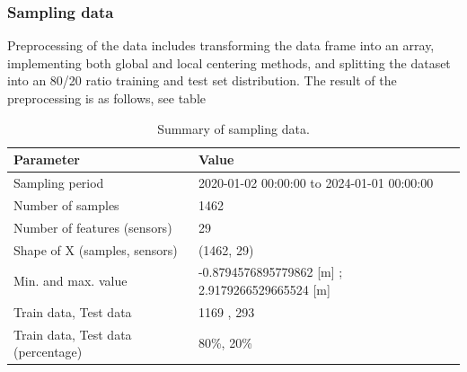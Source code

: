 \subsubsection{Sampling data}
Preprocessing of the data includes transforming the data frame into an array, implementing both global and local centering methods, and splitting the dataset into an 80/20 ratio training and test set distribution. The result of the preprocessing is as follows, see table 
\begin{table}[htbp]
\centering
\caption{Summary of sampling data.}
\label{data}
\begin{tabular}{|l|l|}
\hline
\textbf{Parameter}                           & \textbf{Value}                                \\ \hline
Sampling period                              & 2020-01-02 00:00:00 to 2024-01-01 00:00:00\\ \hline
Number of samples                            & 1462\\ \hline
Number of features (sensors)                 & 29                                            \\ \hline
Shape of X (samples, sensors)                & (1462, 29)\\ \hline
Min. and max. value                          & -0.8794576895779862 [m] ; 2.9179266529665524 [m]\\ \hline
Train data, Test data                        & 1169 , 293\\ \hline
Train data, Test data (percentage)           & 80\%, 20\%                                  \\ \hline
\end{tabular}
\end{table} 

